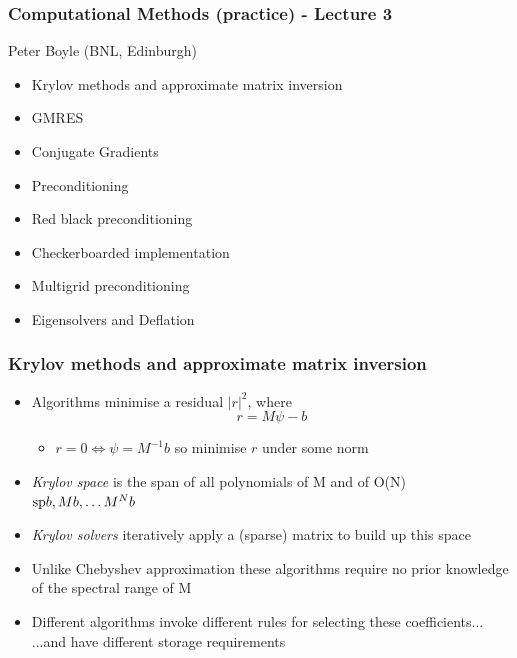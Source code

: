 \documentclass[pdf,ps,8pt]{beamer}
\begin{document}
\begin{frame}[fragile]\small\frametitle{  Computational Methods (practice) -  Lecture 3    }

  \begin{center}
 
  {\color{red} Peter Boyle} (BNL, Edinburgh)

  \begin{itemize}
  \item Krylov methods and approximate matrix inversion
  \item GMRES
  \item Conjugate Gradients
  \item Preconditioning
  \item Red black preconditioning
  \item Checkerboarded implementation
  \item Multigrid preconditioning
  \item Eigensolvers and Deflation
  \end{itemize}

\end{center}  
\end{frame}

  \begin{frame}[fragile]\small\frametitle{ Krylov methods and approximate matrix inversion}
  \begin{itemize}
  \item Algorithms minimise a residual $|r|^2$, where
    $$
    r = M \psi - b
    $$
  \begin{itemize}
  \item $r=0 \Leftrightarrow \psi = M^{-1} b$ so minimise $r$ under some norm
  \end{itemize}
  \item \emph{Krylov space} is the span of all polynomials of M and of O(N) $ {\rm sp} { b , M b, \ldots M^N b}$
  \item \emph{Krylov solvers} iteratively apply a (sparse) matrix to build up this space
  \item Unlike Chebyshev approximation these algorithms require no prior knowledge of the spectral range of M
  \item Different algorithms invoke different rules for selecting these coefficients...\\ ...and have different storage requirements
  \end{itemize}
  \end{frame}
\end{document}
